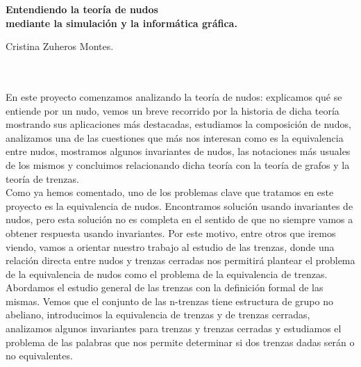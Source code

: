 
\cleardoublepage
\thispagestyle{empty}

\begin{center}
{\large\bfseries Entendiendo la teoría de nudos\\
	 mediante la simulación y la informática gráfica.}\\
\end{center}
\begin{center}
Cristina Zuheros Montes.\\
\end{center}

\\

\vspace{0.7cm}
\\
En este proyecto comenzamos analizando la teoría de nudos: explicamos qué se entiende por un nudo, vemos un breve recorrido por la historia de dicha teoría mostrando sus aplicaciones más destacadas, estudiamos la composición de nudos, analizamos una de las cuestiones que más nos interesan como es la equivalencia entre nudos, mostramos algunos invariantes de nudos, las notaciones más usuales de los mismos y concluimos relacionando dicha teoría con la teoría de grafos y la teoría de trenzas.\\

Como ya hemos comentado, uno de los problemas clave que tratamos en este proyecto es la equivalencia de nudos. Encontramos solución usando invariantes de nudos, pero esta solución no es completa en el sentido de que no siempre vamos a obtener respuesta usando invariantes. Por este motivo, entre otros que iremos viendo, vamos a orientar nuestro trabajo al estudio de las trenzas, donde una relación directa entre nudos y trenzas cerradas nos permitirá plantear el problema de la equivalencia de nudos como el problema de la equivalencia de trenzas.\\ 

Abordamos el estudio general de las trenzas con la definición formal de las mismas. Vemos que el conjunto de las n-trenzas tiene estructura de grupo no abeliano, introducimos la equivalencia de trenzas y de trenzas cerradas, analizamos algunos invariantes para trenzas y trenzas cerradas y estudiamos el problema de las palabras que nos permite determinar si dos trenzas dadas serán o no equivalentes. \\

